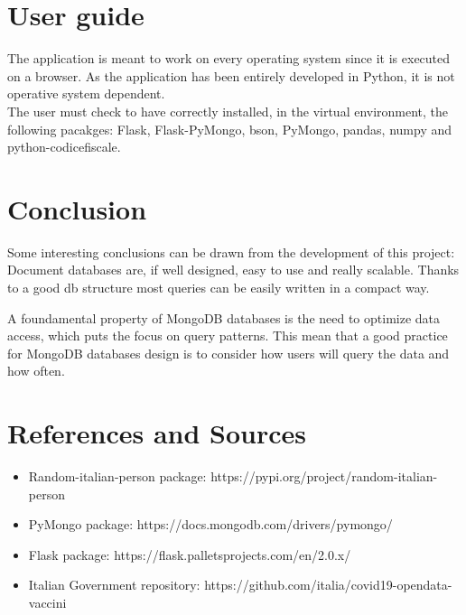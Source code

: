 \documentclass{article}
\begin{document}
\newpage

\section{User guide}
The application is meant to work on every operating system since it is executed on a browser. As the application has been entirely developed in Python, it is not operative system dependent.
\\The user must check to have correctly installed, in the virtual environment, the following pacakges: {\selectfont Flask, Flask-PyMongo, bson, PyMongo, pandas, numpy and python-codicefiscale}.

\section{Conclusion}

Some interesting conclusions can be drawn from the development of this project: Document databases are, if well designed, easy to use and really scalable. Thanks to a good db structure most queries can be easily written in a compact way. 

A foundamental property of MongoDB databases is the need to optimize data access, which puts the focus on query patterns. This mean that a good practice for MongoDB databases design is to consider how users will query the data and how often.

\section{References and Sources}
\begin{itemize}
    \item Random-italian-person package: https://pypi.org/project/random-italian-person
    \item PyMongo package: https://docs.mongodb.com/drivers/pymongo/
    \item Flask package: https://flask.palletsprojects.com/en/2.0.x/
    \item Italian Government repository: https://github.com/italia/covid19-opendata-vaccini
\end{itemize}
\end{document}
